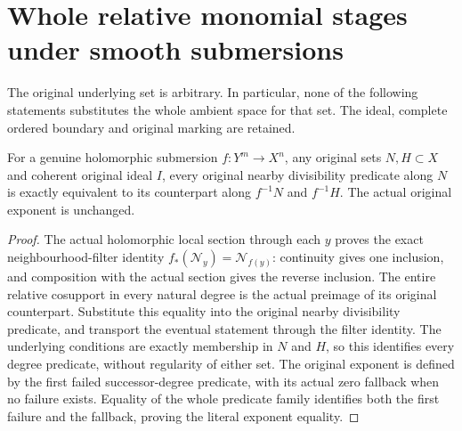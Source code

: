 \section{Whole relative monomial stages under smooth submersions}

The original underlying set is arbitrary. In particular, none of the
following statements substitutes the whole ambient space for that set.
The ideal, complete ordered boundary and original marking are retained.

\begin{theorem}
\label{hir:smooth-relative-monomial-divisibility}
For a genuine holomorphic submersion $f:Y^m\to X^n$, any original sets
$N,H\subset X$ and coherent original ideal $I$, every original nearby
divisibility predicate along $N$ is exactly equivalent to its counterpart
along $f^{-1}N$ and $f^{-1}H$. The actual original exponent is unchanged.
\end{theorem}
\begin{proof}
The actual holomorphic local section through each $y$ proves the exact
neighbourhood-filter identity $f_*(\mathcal N_y)=\mathcal N_{f(y)}$:
continuity gives one inclusion, and composition with the actual section
gives the reverse inclusion. The entire relative cosupport in every
natural degree is the actual preimage of its original counterpart.
Substitute this equality into the original nearby divisibility predicate,
and transport the eventual statement through the filter identity. The
underlying conditions are exactly membership in $N$ and $H$, so this
identifies every degree predicate, without regularity of either set.
The original exponent is defined by the first failed successor-degree
predicate, with its actual zero fallback when no failure exists. Equality
of the whole predicate family identifies both the first failure and the
fallback, proving the literal exponent equality.
\end{proof}
\leanok


